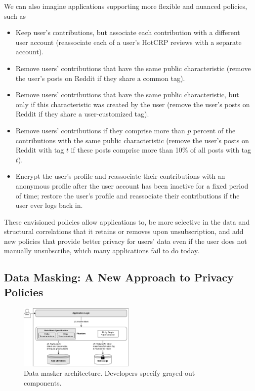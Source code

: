 We can also imagine applications supporting more flexible and nuanced policies, such as
\begin{itemize}[nosep]
    \item Keep user's contributions, but associate each contribution with a different user account
        (\eg reassociate each of a user's HotCRP reviews with a separate account).
    \item Remove users' contributions that have the same public characteristic (\eg remove the user's
       posts on Reddit if they share a common tag).
    \item Remove users' contributions that have the same public characteristic, but only if this
        characteristic was created by the user (\eg remove the user's posts on Reddit if they share
        a user-customized tag).
    \item Remove users' contributions if they comprise more than $p$
            percent of the contributions with the same public characteristic (\eg remove the user's
            posts on Reddit with tag $t$ if these posts comprise more than 10\% of all posts with
            tag $t$).
    \item Encrypt the user's profile and reassociate their contributions with an anonymous
        profile after the user account has been inactive for a fixed period of time;
        restore the user's profile and reassociate their contributions if the user ever logs back in.
\end{itemize}
These envisioned policies allow applications to, \eg be more selective in the data and structural
correlations that it retains or removes upon unsubscription, and add new policies that provide
better privacy for users' data even if the user does not manually unsubscribe, which many applications
fail to do today.

\subsection{Data Masking: A New Approach to Privacy Policies}
\begin{figure}[t!]
    \centering
    \includegraphics[width=0.5\textwidth]{img/impl}

    \caption{Data masker architecture. Developers specify grayed-out components.}
    \label{fig:arch}
\end{figure}

